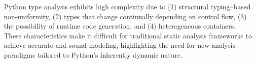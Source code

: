 \begin{tcolorbox}[colback=white,colframe=blue!60,title=Answer to RQ2,fonttitle=\bfseries]
  Python type analysis exhibits high complexity due to
  (1) structural typing–based non-uniformity,
  (2) types that change continually depending on control flow,
  (3) the possibility of runtime code generation, and
  (4) heterogeneous containers.
  These characteristics make it difficult for traditional static analysis
  frameworks to achieve accurate and sound modeling, highlighting the need for
  new analysis paradigms tailored to Python’s inherently dynamic nature.
\end{tcolorbox}
